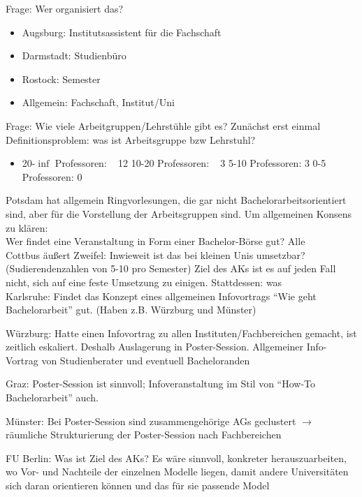     Frage: Wer organisiert das? \\
    \begin{itemize}
      \item Augsburg: Institutsassistent für die Fachschaft
      \item Darmstadt: Studienbüro
      \item Rostock: Semester
      \item Allgemein: Fachschaft, Institut/Uni
    \end{itemize}

    Frage: Wie viele Arbeitgruppen/Lehrstühle gibt es? Zunächst erst einmal Definitionsproblem: was ist Arbeitsgruppe bzw Lehrstuhl?
    \begin{itemize}
      \item 20-$\inf$ Professoren: ~ 12
      10-20 Professoren: ~ 3
      5-10 Professoren: 3
      0-5 Professoren: 0
    \end{itemize}

    Potsdam hat allgemein Ringvorlesungen, die gar nicht Bachelorarbeitsorientiert sind, aber für die Vorstellung der Arbeitsgruppen sind.
    Um allgemeinen Konsens zu klären: \\
    Wer findet eine Veranstaltung in Form einer Bachelor-Börse gut? Alle \\

    Cottbus äußert Zweifel: Inwieweit ist das bei kleinen Unis umsetzbar? (Sudierendenzahlen von 5-10 pro Semester)
    Ziel des AKs ist es auf jeden Fall nicht, sich auf eine feste Umsetzung zu einigen. Stattdessen: was \\

    Karlsruhe: Findet das Konzept eines allgemeinen Infovortrags “Wie geht Bachelorarbeit” gut. (Haben z.B. Würzburg und Münster)

    Würzburg: Hatte einen Infovortrag zu allen Instituten/Fachbereichen gemacht, ist zeitlich eskaliert. Deshalb Auslagerung in Poster-Session. Allgemeiner Info-Vortrag von Studienberater und eventuell Bacheloranden

    Graz: Poster-Session ist sinnvoll; Infoveranstaltung im Stil von “How-To Bachelorarbeit” auch.

    Münster: Bei Poster-Session sind zusammengehörige AGs geclustert $\rightarrow$ räumliche Strukturierung der Poster-Session nach Fachbereichen

    FU Berlin: Was ist Ziel des AKs? Es wäre sinnvoll, konkreter herauszuarbeiten, wo Vor- und Nachteile der einzelnen Modelle liegen, damit andere Universitäten sich daran orientieren können und das für sie passende Model

